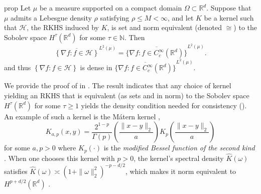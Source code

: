 \documentclass[11pt]{article}
\begin{document}
\begin{restatable}{prop}{} \label{suff cond for density}
    Let $\mu$ be a measure supported on a compact domain $\Omega \subset \mathbb{R}^d$. Suppose that $\mu$ admits a Lebesgue density $\rho$ satisfying $\rho \leq M < \infty$, and let $K$ be a kernel such that $\mathcal{H}$, the RKHS induced by $K$, is set and norm equivalent (denoted $\cong$) to the Sobolev space $H^\tau(\mathbb{R}^d)$ for some $\tau \in \mathbb{N}$. Then
    \[\overline{\left\{\nabla f : f \in \mathcal{H}\right\}}^{L^2(\mu)} = \overline{\{\nabla f: f \in C^\infty_c(\mathbb{R}^d)\}}^{L^2(\mu)}.\]
    and thus $\left\{\nabla f : f \in \mathcal{H}\right\}$ is dense in $\overline{\{\nabla f: f \in C^\infty_c(\mathbb{R}^d)\}}^{L^2(\mu)}.$
\end{restatable}

We provide the proof of  in . The result indicates that any choice of kernel yielding an RKHS that is equivalent (as sets and in norm) to the Sobolev space $H^{\tau}(\mathbb{R}^d)$ for some $\tau \geq 1$ yields the density condition needed for consistency (). An example of such a kernel is the M\'atern kernel \citep{matern1960spatial},
\begin{equation}
    K_{a, p}(x,y) = \frac{2^{1-p}}{\Gamma(p)}\left(\frac{\|x - y\|_2}{a}\right)K_p\left(\frac{\|x - y\|_2}{a}\right)
\end{equation}
for some $a, p > 0$ where $K_p(\cdot)$ is the \textit{modified Bessel function of the second kind} \citep{emery2025towards}. When one chooses this kernel with $p > 0$, the kernel's spectral density $\widehat K(\omega)$ satisfies $ \widehat K(\omega)\asymp (1 + \|\omega\|_2^2)^{-p-d/2}$, which makes it norm equivalent to $H^{p+d/2}(\mathbb{R}^d)$ \citep{emery2025towards}. 
\end{document}
